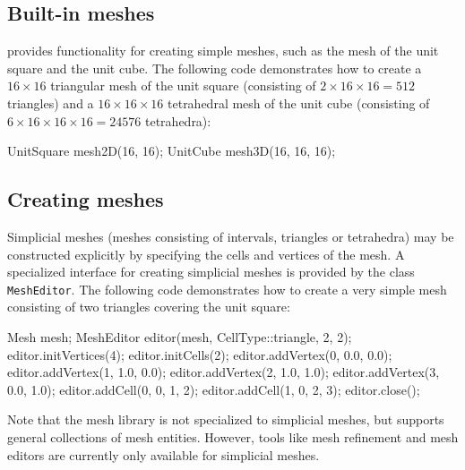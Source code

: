 \subsection{Built-in meshes}

\dolfin{} provides functionality for creating simple meshes, such as
the mesh of the unit square and the unit cube. The following code
demonstrates how to create a $16\times 16$ triangular mesh of the unit square
(consisting of $2\times 16\times 16 = 512$ triangles) and a
$16\times 16\times 16$ tetrahedral mesh of the unit cube (consisting
of $6\times 16\times 16\times 16 = 24576$ tetrahedra):
\begin{code}
UnitSquare mesh2D(16, 16);
UnitCube mesh3D(16, 16, 16);
\end{code}


\subsection{Creating meshes}

Simplicial meshes (meshes consisting of intervals, triangles or
tetrahedra) may be constructed explicitly by specifying the
cells and vertices of the mesh. A specialized interface for creating
simplicial meshes is provided by the class \texttt{MeshEditor}.
The following code demonstrates how to create a very simple mesh
consisting of two triangles covering the unit square:
\begin{code}
Mesh mesh;
MeshEditor editor(mesh, CellType::triangle, 2, 2);
editor.initVertices(4);
editor.initCells(2);
editor.addVertex(0, 0.0, 0.0);
editor.addVertex(1, 1.0, 0.0);
editor.addVertex(2, 1.0, 1.0);
editor.addVertex(3, 0.0, 1.0);
editor.addCell(0, 0, 1, 2);
editor.addCell(1, 0, 2, 3);
editor.close();
\end{code}
Note that the \dolfin{} mesh library is not specialized to simplicial
meshes, but supports general collections of mesh entities. However,
tools like mesh refinement and mesh editors are currently only
available for simplicial meshes.
